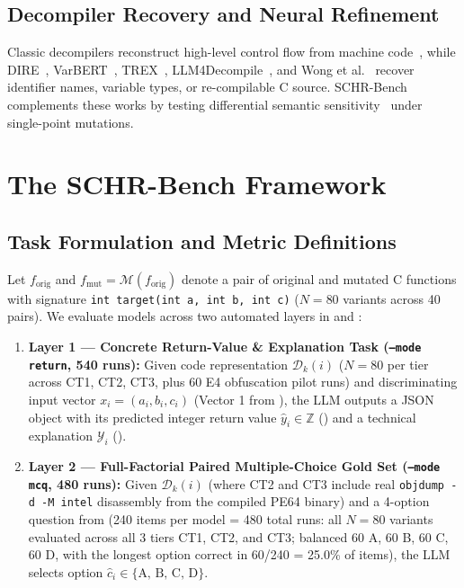 \documentclass[conference]{IEEEtran}
\begin{document}
\subsection{Decompiler Recovery and Neural Refinement}
Classic decompilers reconstruct high-level control flow from machine code~\cite{cifuentes1995decompilation,yakdan2015norepdb,schwarz2002disassembly}, while DIRE~\cite{lacomis2019dire}, VarBERT~\cite{chen2022varbert}, TREX~\cite{pei2021trex}, LLM4Decompile~\cite{tan2024llm4decompile}, and Wong et al.~\cite{wong2023refining} recover identifier names, variable types, or re-compilable C source. SCHR-Bench complements these works by testing differential semantic sensitivity~\cite{jia2011analysis} under single-point mutations.

\section{The SCHR-Bench Framework}

\subsection{Task Formulation and Metric Definitions}
Let $f_{\text{orig}}$ and $f_{\text{mut}} = \mathcal{M}(f_{\text{orig}})$ denote a pair of original and mutated C functions with signature \texttt{int target(int a, int b, int c)} ($N = 80$ variants across 40 pairs). We evaluate models across two automated layers in  and :
\begin{enumerate}
    \item \textbf{Layer 1 --- Concrete Return-Value \& Explanation Task (\texttt{--mode return}, 540 runs):} Given code representation $\mathcal{D}_k(i)$ ($N=80$ per tier across CT1, CT2, CT3, plus 60 E4 obfuscation pilot runs) and discriminating input vector $x_i = (a_i, b_i, c_i)$ (Vector 1 from ), the LLM outputs a JSON object with its predicted integer return value $\hat{y}_i \in \mathbb{Z}$ () and a technical explanation $\mathcal{Y}_i$ ().
    \item \textbf{Layer 2 --- Full-Factorial Paired Multiple-Choice Gold Set (\texttt{--mode mcq}, 480 runs):} Given $\mathcal{D}_k(i)$ (where CT2 and CT3 include real \texttt{objdump -d -M intel} disassembly from the compiled PE64 binary) and a 4-option question from  (240 items per model = 480 total runs: all $N=80$ variants evaluated across all 3 tiers CT1, CT2, and CT3; balanced 60 A, 60 B, 60 C, 60 D, with the longest option correct in 60/240 = 25.0\% of items), the LLM selects option $\hat{c}_i \in \{\text{A, B, C, D}\}$.
\end{enumerate}
\end{document}

